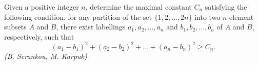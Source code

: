 Given a positive integer $n$, determine the maximal constant $C_n$ satisfying the following condition: for any partition of the set $\{1,2,\ldots,2n \}$ into two $n$-element subsets $A$ and $B$, there exist labellings $a_1,a_2,\ldots,a_n$ and $b_1,b_2,\ldots,b_n$ of $A$ and $B$, respectively, such that
$$
(a_1-b_1)^2+(a_2-b_2)^2+\ldots+(a_n-b_n)^2\ge C_n.
$$
\textit{(B. Serankou, M. Karpuk)}